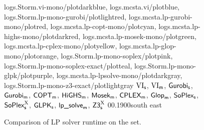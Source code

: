 \begin{figure*}[!htp]

	\centering
\renewcommand{\quantileplotlegendcols}{3}
	{logs.Storm.vi-mono/plotdarkblue, 
	logs.mcsta.vi/plotblue, 
	logs.Storm.lp-mono-gurobi/plotlightred, 
	logs.mcsta.lp-gurobi-mono/plotred, 
	logs.mcsta.lp-copt-mono/plotcyan, 
	logs.mcsta.lp-highs-mono/plotdarkred, 
	logs.mcsta.lp-mosek-mono/plotgreen, 
	logs.mcsta.lp-cplex-mono/plotyellow, 
	logs.mcsta.lp-glop-mono/plotorange, 
	logs.Storm.lp-mono-soplex/plotpink, 
	logs.Storm.lp-mono-soplex-exact/plotteal, 
	logs.Storm.lp-mono-glpk/plotpurple, 
	logs.mcsta.lp-lpsolve-mono/plotdarkgray,
	logs.Storm.lp-mono-z3-exact/plotlightgray}
	{$\text{VI}_\textsf{s}$, 
	$\text{VI}_\textsf{m}$, 
	$\textsf{Gurobi}_\textsf{s}$, 
	$\textsf{Gurobi}_\textsf{m}$, 
	$\textsf{COPT}_\textsf{m}$, 
	$\textsf{HiGHS}_\textsf{m}$,  
	$\textsf{Mosek}_\textsf{m}$, 
	$\textsf{CPLEX}_\textsf{m}$,
	$\textsf{Glop}_\textsf{m}$, 
	$\textsf{SoPlex}_\textsf{s}$, 
	$\textsf{SoPlex}_\textsf{s}^\mathrm{X}$,
	$\textsf{GLPK}_\textsf{s}$, 
	$\textsf{lp\_solve}_\textsf{m}$, 
	$\textsf{Z3}_\textsf{s}^\mathrm{X}$ }
	{0}{\numcommunity}{0.1}{900}{south east}
	\caption{Comparison of LP solver runtime on the \comset set.}
	\label{fig:LPSolvers}
\end{figure*}
